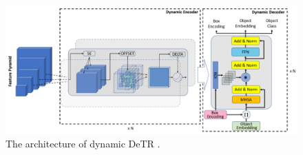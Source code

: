 \documentclass[preprint,12pt]{elsarticle}
\begin{document}
\begin{figure}[h!]
    \centering
    \includegraphics[scale=0.7]{fig_obj_det_Dynamic-DETR.png}
    \caption{The architecture of dynamic DeTR \citep{dai_dynamic_2021}.}
    \label{fig_obj_det_Dynamic-DETR}
\end{figure}
\end{document}
